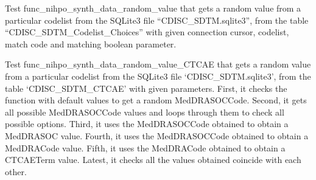 \documentclass[letterpaper,10pt,english]{sphinxmanual}
\begin{document}
\begin{fulllineitems}
\begin{fulllineitems}
\end{fulllineitems}


\begin{fulllineitems}
\label{\detokenize{CE_app.tests:CE_app.tests.test_nihpo_functions.TrialTestCase.test_func_nihpo_synth_data_random_value}}
\sphinxAtStartPar
Test func\_nihpo\_synth\_data\_random\_value that gets a random value from a particular codelist
from the SQLite3 file “CDISC\_SDTM.sqlite3”, from the table “CDISC\_SDTM\_Codelist\_Choices” with given
connection cursor, codelist, match code and matching boolean parameter.

\end{fulllineitems}


\begin{fulllineitems}
\label{\detokenize{CE_app.tests:CE_app.tests.test_nihpo_functions.TrialTestCase.test_func_nihpo_synth_data_random_value_CTCAE}}
\sphinxAtStartPar
Test func\_nihpo\_synth\_data\_random\_value\_CTCAE that gets a random value from a particular codelist
from the SQLite3 file ‘CDISC\_SDTM.sqlite3’, from the table ‘CDISC\_SDTM\_CTCAE’ with given parameters.
First, it checks the function with default values to get a random MedDRASOCCode.
Second, it gets all possible MedDRASOCCode values and loops through them to check all possible options.
Third, it uses the MedDRASOCCode obtained to obtain a MedDRASOC value.
Fourth, it uses the MedDRASOCCode obtained to obtain a MedDRACode value.
Fifth, it uses the MedDRACode obtained to obtain a CTCAETerm value.
Latest, it checks all the values obtained coincide with each other.

\end{fulllineitems}



\end{fulllineitems}
\end{document}
